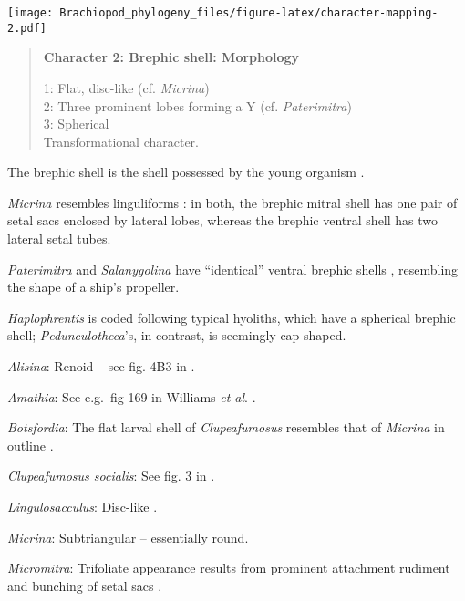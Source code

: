 \documentclass[openany]{book}
\theoremstyle{definition}
\theoremstyle{definition}
\theoremstyle{definition}
\theoremstyle{remark}
\begin{document}
\texttt{[image: Brachiopod\_phylogeny\_files/figure-latex/character-mapping-2.pdf]}

\begin{quote}
\textbf{Character 2: Brephic shell: Morphology}

1: Flat, disc-like (cf. \emph{Micrina})\\
2: Three prominent lobes forming a Y (cf. \emph{Paterimitra})\\
3: Spherical\\
Transformational character.
\end{quote}

The brephic shell is the shell possessed by the young organism
\citep[see][ and references therein for discussion of
terminology]{Ushatinskaya2016Revisionof}.

\emph{Micrina} resembles linguliforms \citep{Holmer2011Firstrecord}: in
both, the brephic mitral shell has one pair of setal sacs enclosed by
lateral lobes, whereas the brephic ventral shell has two lateral setal
tubes.

\emph{Paterimitra} and \emph{Salanygolina} have ``identical'' ventral
brephic shells \citep{Holmer2011Firstrecord}, resembling the shape of a
ship's propeller.

\emph{Haplophrentis} is coded following typical hyoliths, which have a
spherical brephic shell; \emph{Pedunculotheca}'s, in contrast, is
seemingly cap-shaped.

\hypertarget{Alisina-coding-2}{}
\emph{Alisina}: Renoid -- see fig. 4B3 in \citet{Topper2013Theoldest}.

\hypertarget{Amathia-coding-2}{}
\emph{Amathia}: See e.g.~fig 169 in Williams \emph{et al}.
\citeyearpar{Williams1997Introduction}.

\hypertarget{Botsfordia-coding-2}{}
\emph{Botsfordia}: The flat larval shell of \emph{Clupeafumosus}
resembles that of \emph{Micrina} in outline
\citetext{\citealp{Topper2013Reappraisalof}; \citealp[cf.][]{Holmer2011Firstrecord}}.

\hypertarget{Clupeafumosus_socialis-coding-2}{}
\emph{Clupeafumosus socialis}: See fig. 3 in
\citet{Bassett2017Earliestontogeny}.

\hypertarget{Lingulosacculus-coding-2}{}
\emph{Lingulosacculus}: Disc-like \citep{Li2004}.

\hypertarget{Micrina-coding-2}{}
\emph{Micrina}: Subtriangular -- essentially round.

\hypertarget{Micromitra-coding-2}{}
\emph{Micromitra}: Trifoliate appearance results from prominent
attachment rudiment and bunching of setal sacs
\citep{Balthasar2009Thebrachiopod}.
\end{document}
